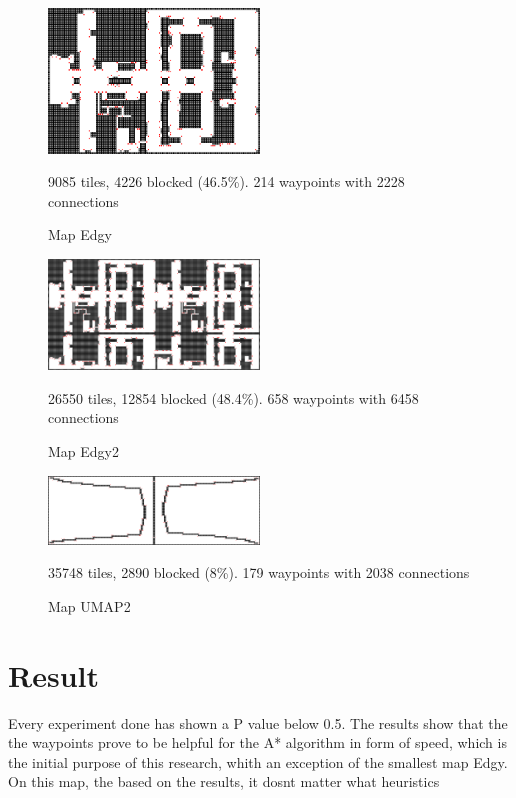\documentclass[a4paper]{article}
\begin{document}
\makeatletter
\setlength{\@fptop}{0pt}
\makeatother

\begin{figure}[t!]
\centering
\includegraphics[width=0.5\textwidth,height=\textheight,keepaspectratio]{Data/Edgy.png}
\caption{Map Edgy}
9085 tiles, 4226 blocked (46.5\%). 214 waypoints with 2228 connections
\label{fig:Edgy}
\end{figure}

\begin{figure}[t!]
\centering
\includegraphics[width=0.5\textwidth,height=\textheight,keepaspectratio]{Data/Edgy2.png}
\caption{Map Edgy2}
26550 tiles, 12854 blocked (48.4\%). 658 waypoints with 6458 connections
\label{fig:Edgy2}
\end{figure}

\begin{figure}[t!]
\centering
\includegraphics[width=0.5\textwidth,height=\textheight,keepaspectratio]{Data/UMAP2.png}
\caption{Map UMAP2}
35748 tiles, 2890 blocked (8\%). 179 waypoints with 2038 connections
\label{fig:UMAP2}
\end{figure}





\section{Result}
Every experiment done has shown a P value below 0.5. The results show that the the waypoints prove to be helpful for the A* algorithm in form of speed, which is the initial purpose of this research, whith an exception of the smallest map Edgy.
On this map, the based on the results, it dosnt matter what heuristics 
\end{document}
